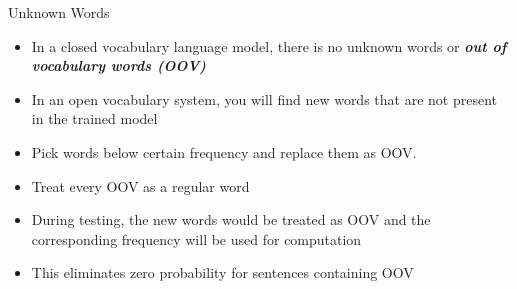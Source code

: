 \begin{frame}{Unknown Words}
\begin{itemize}
	\item In a closed vocabulary language model, there is no unknown words or \textbf{\textit{out of vocabulary words (OOV)}}
	\item In an open vocabulary system, you will find new words that are not present in the trained model
	\item Pick words below certain frequency and replace them as OOV.
	\item Treat every OOV as a regular word
	\item During testing, the new words would be treated as OOV and the corresponding frequency will be used for computation
	\item This eliminates zero probability for sentences containing OOV

\end{itemize}

\end{frame}
%

